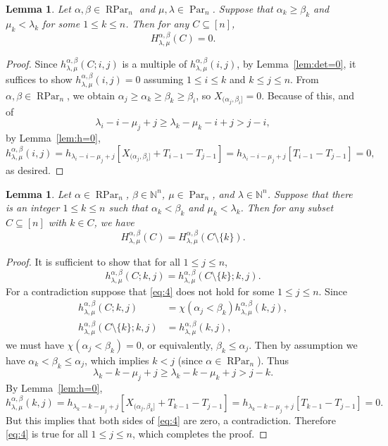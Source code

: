 \documentclass[12pt]{amsart}
\numberwithin{equation}{section}
\newtheorem{lem}[thm]{Lemma}
\theoremstyle{definition}
\newcommand\NN{\mathbb{N}}
\newcommand\Par{\operatorname{Par}}
\newcommand\RPar{\operatorname{RPar}}
\begin{document}
\begin{lem}\label{lem:HC=0 mu<la}
  Let $\alpha,\beta\in\RPar_n$ and $\mu,\lambda\in\Par_n$. Suppose that
  $\alpha_k\ge \beta_k$ and $\mu_k<\lambda_k$ for some $1\le k\le n$. Then for
  any $C\subseteq [n]$,
\[
H^{\alpha,\beta}_{\lambda,\mu}(C)  = 0.
\]
\end{lem}
\begin{proof}
  Since $h^{\alpha,\beta}_{\lambda,\mu}(C;i,j)$ is a multiple of
  $h^{\alpha,\beta}_{\lambda,\mu}(i,j)$, by Lemma~\ref{lem:det=0}, it suffices
  to show $h^{\alpha,\beta}_{\lambda,\mu}(i,j)=0$ assuming $1\le i\le k$ and
  $k\le j\le n$. From $\alpha, \beta \in \RPar_n$, we obtain
  $\alpha_j\ge \alpha_k\ge \beta_k\ge \beta_i$, so
  $X_{(\alpha_j,\beta_i]} = 0$. Because of this, and of
  \[
\lambda_i-i-\mu_j+j\ge \lambda_k-\mu_k-i+j>j-i,
  \]
  by Lemma~\ref{lem:h=0},
  \[
h^{\alpha,\beta}_{\lambda,\mu}(i,j) = h_{\lambda_i-i-\mu_j+j}[X_{(\alpha_j,\beta_i]}+T_{i-1}-T_{j-1}] =
h_{\lambda_i-i-\mu_j+j}[T_{i-1}-T_{j-1}]=0,
  \]
  as desired.
\end{proof}





\begin{lem}\label{lem:H(C)=H(C,k)}
  Let $\alpha\in\RPar_n$, $\beta\in\NN^n$, $\mu\in\Par_n$, and $\lambda\in\NN^n$. Suppose
  that there is an integer $1\le k\le n$ such that $\alpha_k<\beta_k$ and
  $\mu_k<\lambda_k$. Then for any subset $C\subseteq[n]$ with $k\in C$, we have
\[
H^{\alpha,\beta}_{\lambda,\mu}(C)  = H^{\alpha,\beta}_{\lambda,\mu}(C\setminus\{k\}).
\]
\end{lem}
\begin{proof}
  It is sufficient to show that for all $1\le j\le n$,
  \begin{equation}
    \label{eq:4}
h^{\alpha,\beta}_{\lambda,\mu}(C;k,j) = h^{\alpha,\beta}_{\lambda,\mu}(C\setminus \{k\};k,j).
  \end{equation}
  For a contradiction suppose that \eqref{eq:4} does not hold for some
  $1\le j\le n$. Since
  \begin{align*}
    h^{\alpha,\beta}_{\lambda,\mu}(C;k,j) &=
    \chi(\alpha_j<\beta_k) h^{\alpha,\beta}_{\lambda,\mu}(k,j),\\
    h^{\alpha,\beta}_{\lambda,\mu}(C\setminus\{k\};k,j) &=
     h^{\alpha,\beta}_{\lambda,\mu}(k,j),
  \end{align*}
  we must have $\chi(\alpha_j<\beta_k)=0$, or equivalently, $\beta_k\le
  \alpha_j$. Then by assumption we have $\alpha_{k}<\beta_k\le \alpha_j$, which
  implies $k< j$ (since $\alpha \in \RPar_n$). Thus
  \[
    \lambda_k-k-\mu_j+j\ge \lambda_k-k-\mu_k+j > j-k.
  \]
  By Lemma~\ref{lem:h=0},
  \[
    h^{\alpha,\beta}_{\lambda,\mu}(k,j) =
    h_{\lambda_k-k-\mu_j+j}[X_{(\alpha_j,\beta_k]}+T_{k-1}-T_{j-1}] =
    h_{\lambda_k-k-\mu_j+j}[T_{k-1}-T_{j-1}]=0.
  \]
  But this implies that both sides of \eqref{eq:4} are zero, a contradiction.
  Therefore \eqref{eq:4} is true for all $1\le j\le n$, which completes the
  proof.
\end{proof}
\end{document}
